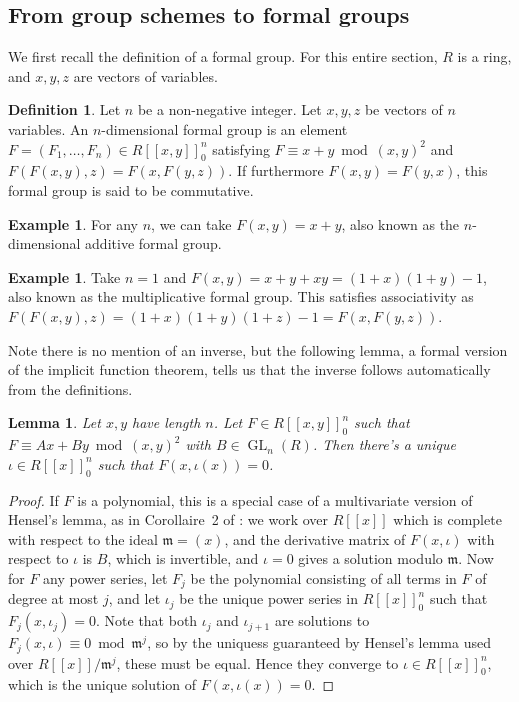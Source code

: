 \documentclass[12pt]{article}
\newcommand{\m}{\mathfrak{m}}
\DeclareMathOperator{\GL}{GL}
\theoremstyle{plain}
\newtheorem{lem}[thm]{Lemma} %
\theoremstyle{definition}
\newtheorem{defn}[thm]{Definition} %
\newtheorem{exmp}[thm]{Example} %
\theoremstyle{remark}
\begin{document}
\subsection{From group schemes to formal groups}
We first recall the definition of a formal group. For this entire section, $R$ is a ring, and $x,y,z$ are vectors of variables.
\begin{defn}
\label{defn:formalgroup}
Let $n$ be a non-negative integer. Let $x,y,z$ be vectors of $n$ variables. An $n$-dimensional formal group is an element $F = (F_1,\dots,F_n) \in R[[x,y]]_0^n$ satisfying $F \equiv x + y \bmod (x,y)^2$ and $F(F(x,y),z) = F(x,F(y,z))$. If furthermore $F(x,y) = F(y,x)$, this formal group is said to be commutative.
\end{defn}
\begin{exmp}
\label{exmp:ganformalgroup}
For any $n$, we can take $F(x,y) = x+ y$, also known as the $n$-dimensional additive formal group.
\end{exmp}
\begin{exmp}
\label{exmp:gmformalgroup}
Take $n=1$ and $F(x,y) = x + y + xy = (1+x)(1+y)-1$, also known as the multiplicative formal group. This satisfies associativity as $F(F(x,y),z) = (1+x)(1+y)(1+z)-1 = F(x,F(y,z))$.
\end{exmp}
Note there is no mention of an inverse, but the following lemma, a formal version of the implicit function theorem, tells us that the inverse follows automatically from the definitions.
\begin{lem}
\label{lem:implicitfunction}
Let $x,y$ have length $n$. Let $F \in R[[x,y]]_0^n$ such that $F \equiv Ax + By \bmod (x,y)^2$ with $B \in \GL_n(R)$. Then there's a unique $\iota \in R[[x]]_0^n$ such that $F(x,\iota(x)) = 0$. 
\end{lem}
\begin{proof}
If $F$ is a polynomial, this is a special case of a multivariate version of Hensel's lemma, as in Corollaire~2 of \cite[III,4.5]{BourbakiCA}: we work over $R[[x]]$ which is complete with respect to the ideal $\m = (x)$, and the derivative matrix of $F(x,\iota)$ with respect to $\iota$ is $B$, which is invertible, and $\iota = 0$ gives a solution modulo $\m$. Now for $F$ any power series, let $F_j$ be the polynomial consisting of all terms in $F$ of degree at most $j$, and let $\iota_j$ be the unique power series in $R[[x]]_0^n$ such that $F_j(x,\iota_j) = 0$. Note that both $\iota_j$ and $\iota_{j+1}$ are solutions to $F_j(x,\iota) \equiv 0 \bmod \m^j$, so by the uniquess guaranteed by Hensel's lemma used over $R[[x]]/\m^j$, these must be equal. Hence they converge to $\iota \in R[[x]]_0^n$, which is the unique solution of $F(x,\iota(x)) = 0$.
\end{proof}
\end{document}
